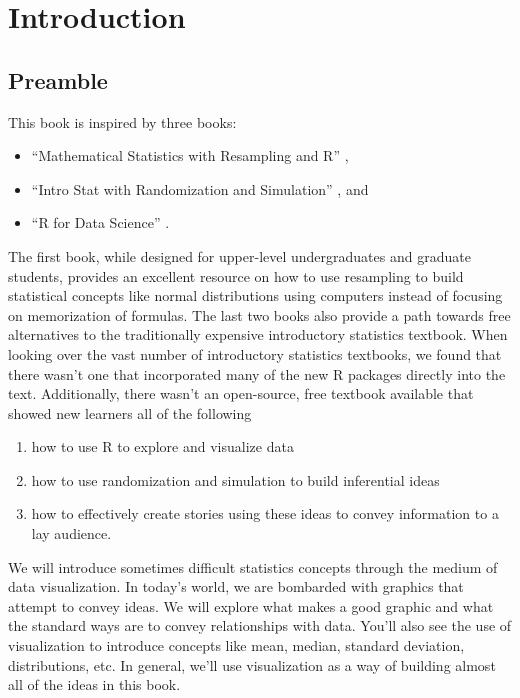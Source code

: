 \documentclass[]{tufte-book}
\providecommand{\tightlist}{%
  \setlength{\itemsep}{0pt}\setlength{\parskip}{0pt}}
\begin{document}
\chapter{Introduction}\label{intro}

\section{Preamble}\label{preamble-1}

This book is inspired by three books:

\begin{itemize}
\tightlist
\item
  ``Mathematical Statistics with Resampling and R'' \citep{hester2011},
\item
  ``Intro Stat with Randomization and Simulation'' \citep{isrs2014}, and
\item
  ``R for Data Science'' \citep{rds2016}.
\end{itemize}

The first book, while designed for upper-level undergraduates and
graduate students, provides an excellent resource on how to use
resampling to build statistical concepts like normal distributions using
computers instead of focusing on memorization of formulas. The last two
books also provide a path towards free alternatives to the traditionally
expensive introductory statistics textbook. When looking over the vast
number of introductory statistics textbooks, we found that there wasn't
one that incorporated many of the new R packages directly into the text.
Additionally, there wasn't an open-source, free textbook available that
showed new learners all of the following

\begin{enumerate}
\def\labelenumi{\arabic{enumi}.}
\tightlist
\item
  how to use R to explore and visualize data
\item
  how to use randomization and simulation to build inferential ideas
\item
  how to effectively create stories using these ideas to convey
  information to a lay audience.
\end{enumerate}

We will introduce sometimes difficult statistics concepts through the
medium of data visualization. In today's world, we are bombarded with
graphics that attempt to convey ideas. We will explore what makes a good
graphic and what the standard ways are to convey relationships with
data. You'll also see the use of visualization to introduce concepts
like mean, median, standard deviation, distributions, etc. In general,
we'll use visualization as a way of building almost all of the ideas in
this book.
\end{document}
